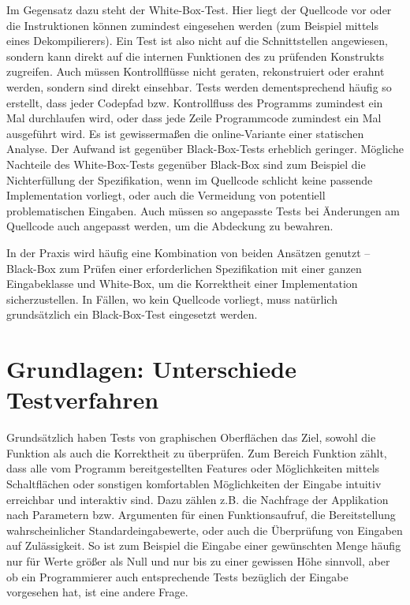 Im Gegensatz dazu steht der White-Box-Test\cite{bookwhitebox}.
Hier liegt der Quellcode vor oder die Instruktionen können zumindest
eingesehen werden (zum Beispiel mittels eines Dekompilierers).
Ein Test ist also nicht auf die Schnittstellen angewiesen, sondern
kann direkt auf die internen Funktionen des zu prüfenden
Konstrukts zugreifen. Auch müssen Kontrollflüsse nicht geraten,
rekonstruiert oder erahnt werden, sondern sind direkt einsehbar.
Tests werden dementsprechend häufig so erstellt, dass jeder
Codepfad bzw. Kontrollfluss des Programms zumindest ein Mal
durchlaufen wird, oder dass jede Zeile Programmcode zumindest
ein Mal ausgeführt wird. Es ist gewissermaßen die online-Variante
einer statischen Analyse. Der Aufwand ist gegenüber Black-Box-Tests
erheblich geringer. Mögliche Nachteile des White-Box-Tests gegenüber
Black-Box sind zum Beispiel die Nichterfüllung der Spezifikation,
wenn im Quellcode schlicht keine passende Implementation vorliegt,
oder auch die Vermeidung von potentiell problematischen Eingaben.
Auch müssen so angepasste Tests bei Änderungen am Quellcode
auch angepasst werden, um die Abdeckung zu bewahren.

In der Praxis wird häufig eine Kombination von beiden Ansätzen
genutzt -- Black-Box zum Prüfen einer erforderlichen Spezifikation
mit einer ganzen Eingabeklasse und White-Box, um die Korrektheit
einer Implementation sicherzustellen. In Fällen, wo kein Quellcode
vorliegt, muss natürlich grundsätzlich ein Black-Box-Test eingesetzt werden.



\section{Grundlagen: Unterschiede Testverfahren}\label{section:testingapproaches}


Grundsätzlich haben Tests von graphischen Oberflächen das Ziel, sowohl die
Funktion als auch die Korrektheit zu überprüfen. Zum Bereich Funktion zählt,
dass alle vom Programm bereitgestellten Features oder Möglichkeiten mittels
Schaltflächen oder sonstigen komfortablen Möglichkeiten der Eingabe
intuitiv erreichbar und interaktiv sind. Dazu zählen z.B. die Nachfrage
der Applikation nach Parametern bzw. Argumenten für einen Funktionsaufruf,
die Bereitstellung wahrscheinlicher Standardeingabewerte, oder auch die
Überprüfung von Eingaben auf Zulässigkeit. So ist zum Beispiel die
Eingabe einer gewünschten Menge häufig nur für Werte größer als Null
und nur bis zu einer gewissen Höhe sinnvoll, aber ob ein Programmierer
auch entsprechende Tests bezüglich der Eingabe vorgesehen hat, ist
eine andere Frage.

